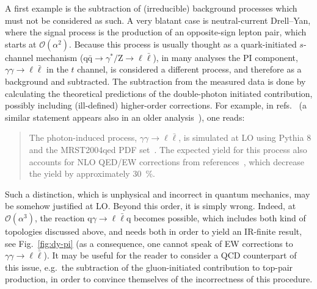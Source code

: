 A first example is the subtraction of (irreducible) background processes which must not be considered as such. A very blatant case
is neutral-current Drell--Yan, where the signal process is the production of an opposite-sign lepton pair, which starts
at $\mathcal O(\alpha^2)$. Because this process is usually thought
as a quark-initiated $s$-channel mechanism ($\mathrm{q} \bar{\mathrm{q}} \to \gamma^*/\mathrm{Z} \to \ell \bar{\ell}$), in many analyses the PI component,
$\gamma \gamma \to \ell \bar{\ell}$ in the $t$ channel, is considered a different process, and therefore as a background and subtracted.
The subtraction from the measured data is done by calculating the theoretical predictions of the double-photon initiated contribution, possibly including (ill-defined) higher-order
corrections. For example, in refs.~\cite{Aaboud:2017ffb,Aad:2016zzw} (a similar statement appears also in an older analysis~\cite{Aad:2013iua}), one reads:
\begin{quote}
The photon-induced process, $\gamma\gamma \to \ell \bar{\ell}$, is simulated at LO using Pythia 8
and the MRST2004qed PDF set~\cite{Martin:2004dh}. The expected yield for this process also accounts for 
NLO QED/EW corrections from references~\cite{Bardin:2012jk,Bondarenko:2013nu}, which decrease the yield by approximately \SI{30}{\percent}.
\end{quote}
Such a distinction, which is unphysical and incorrect in quantum mechanics, may be somehow justified at LO. Beyond this order, it is simply wrong.
Indeed, at $\mathcal O(\alpha^3)$, the reaction $\mathrm{q} \gamma \to \ell \bar{\ell} \mathrm{q}$ becomes possible, which
includes both kind of topologies discussed above, and needs both in order to yield an IR-finite result, see Fig.~\ref{fig:dy-pi} (as a consequence, one cannot speak of EW corrections to $\gamma \gamma \to \ell \bar{\ell}$). It may be useful for the reader to consider a QCD counterpart of this issue, 
e.g.\ the subtraction of the gluon-initiated contribution to top-pair production, in order to convince themselves of the incorrectness of this procedure.

